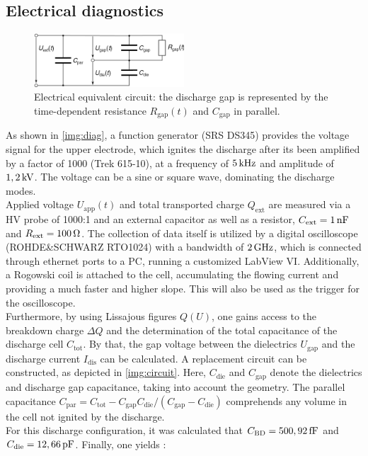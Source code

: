 \documentclass[a4paper,10pt,twoside]{article}
\newcommand{\ix}[1]{_\text{#1}}
\begin{document}
		\subsection{Electrical diagnostics}\label{subsec:electric}
		
				\begin{figure}
					\centering
					\includegraphics[width=0.5\textwidth]{figures/setup/replacementcircuit.pdf}
					\caption{Electrical equivalent circuit: the discharge gap is represented by the time-dependent resistance $R\ix{gap}(t)$ and $C\ix{gap}$ in parallel.}
					\label{img:circuit}
				\end{figure}
		
					 
			 As shown in \autoref{img:diag}, a function generator (SRS DS345) provides the voltage signal for the upper electrode, which ignites the discharge after its been amplified by a factor of 1000 (Trek 615-10), at a frequency of $\unit[5]{kHz}$ and amplitude of $\unit[1,2]{kV}$. The voltage can be a sine or square wave, dominating the discharge modes.\\
			 Applied voltage $U\ix{app}(t)$ and total transported charge $Q\ix{ext}$ are measured via a HV probe of 1000:1 and an external capacitor as well as a resistor, $C\ix{ext}=\unit[1]{nF}$ and $R\ix{ext}=\unit[100]{\Omega}$. The collection of data itself is utilized by a digital oscilloscope (ROHDE\&SCHWARZ RTO1024) with a bandwidth of $\unit[2]{GHz}$, which is connected through ethernet ports to a PC, running a customized LabView VI. Additionally, a Rogowski coil is attached to the cell, accumulating the flowing current and providing a much faster and higher slope. This will also be used as the trigger for the oscilloscope.\\
			 Furthermore, by using Lissajous figures $Q(U)$, one gains access to the breakdown charge $\Delta Q$ and the determination of the total capacitance of the discharge cell $C\ix{tot}$. By that, the gap voltage between the dielectrics $U\ix{gap}$ and the discharge current $I\ix{dis}$ can be calculated. A replacement circuit can be constructed, as depicted in \autoref{img:circuit}. Here, $C\ix{die}$ and $C\ix{gap}$ denote the dielectrics and discharge gap capacitance, taking into account the geometry. The parallel capacitance $C\ix{par}=C\ix{tot}-C\ix{gap}C\ix{die}/\left(C\ix{gap}-C\ix{die}\right)$ comprehends any volume in the cell not ignited by the discharge.\\
			 For this discharge configuration, it was calculated that $C\ix{BD}=\unit[500,92]{fF}$ and $C\ix{die}=\unit[12,66]{pF}$. Finally, one yields \cite{Kogelschatz2003}:
			 
\end{document}

